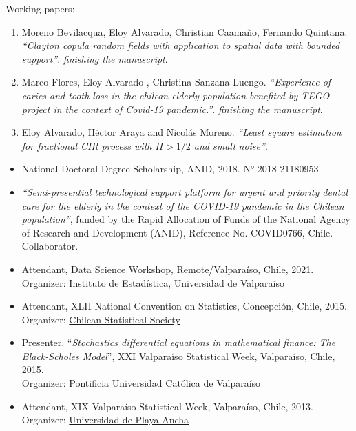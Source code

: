 \documentclass[10pt,a4paper]{article}
\begin{document}
\headedsubsection 
{Working papers:}{}
{\begin{enumerate}
\item Moreno Bevilacqua, Eloy Alvarado, Christian Caamaño, Fernando Quintana. \textit{``Clayton copula random fields with application to spatial data with bounded support''}. \textit{finishing the manuscript}.
\item Marco Flores, Eloy Alvarado , Christina Sanzana-Luengo. \textit{``Experience of caries and tooth loss in the chilean elderly population benefited by TEGO project in the context of Covid-19 pandemic.''}. \textit{finishing the manuscript}.
\item Eloy Alvarado, Héctor Araya and Nicolás Moreno. \textit{``Least square estimation for fractional CIR process with $H>1/2$ and small noise''}.
\end{enumerate}
}

\begin{itemize}
\item National Doctoral Degree Scholarship, ANID, 2018. N° 2018-21180953.
\item \textit{``Semi-presential technological support platform for urgent and
priority dental care for the elderly in the context of the COVID-19 pandemic in the Chilean population''}, funded by the Rapid Allocation of Funds of the National Agency of Research and
Development (ANID), Reference No. COVID0766, Chile. Collaborator.
\end{itemize}




\begin{itemize}
\item Attendant, Data Science Workshop, Remote/Valparaíso, Chile, 2021.\\
Organizer: \href{https://ideuv.uv.cl/}{Instituto de Estadística, Universidad de Valparaíso}

\item Attendant, XLII National Convention on Statistics, Concepción, Chile, 2015. \\
Organizer:  \href{http://www.soche.cl}{ Chilean Statistical
Society}
\item Presenter, ``\textit{Stochastics differential equations in mathematical finance: The Black-Scholes Model}'', XXI Valparaíso Statistical Week, Valparaíso, Chile, 2015. \\ Organizer: \href{http://www.pucv.cl}{Pontificia Universidad Católica de Valparaíso}

\item Attendant, XIX Valparaíso Statistical Week, Valparaíso, Chile, 2013. \\ Organizer:  \href{http://www.upla.cl}{Universidad de Playa Ancha}
\end{itemize}
\end{document}
